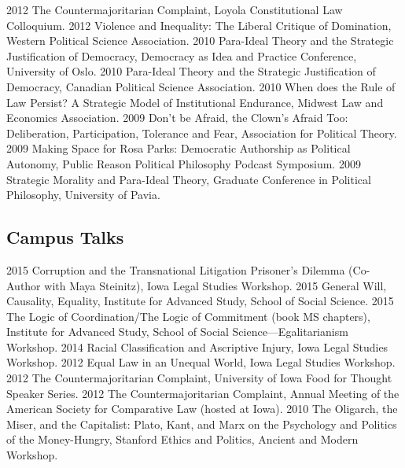 \documentclass[letterpaper]{moderncv}
\begin{document}
\cvitem
{2012}
{The Countermajoritarian Complaint, Loyola Constitutional Law Colloquium.}
\vspace{1mm}
\cvitem
{2012}
{Violence and Inequality: The Liberal Critique of Domination, Western Political Science Association.}
\vspace{1mm}
\cvitem
{2010}
{Para-Ideal Theory and the Strategic Justification of Democracy, Democracy as Idea and Practice Conference, University of Oslo.}
\vspace{1mm}
\cvitem
{2010}
{Para-Ideal Theory and the Strategic Justification of Democracy, Canadian Political Science Association.}
\vspace{1mm}
\cvitem
{2010}
{When does the Rule of Law Persist? A Strategic Model of Institutional Endurance, Midwest Law and Economics Association.}
\vspace{1mm}
\cvitem
{2009}
{Don't be Afraid, the Clown's Afraid Too: Deliberation, Participation, Tolerance and Fear, Association for Political Theory.}
\vspace{1mm}
\cvitem
{2009}
{Making Space for Rosa Parks: Democratic Authorship as Political Autonomy, Public Reason Political Philosophy Podcast Symposium.}
\vspace{1mm}
\cvitem
{2009}
{Strategic Morality and Para-Ideal Theory, Graduate Conference in Political Philosophy, University of Pavia.}
\vspace{1mm}
\subsection{Campus Talks}
\cvitem
{2015}
{Corruption and the Transnational Litigation Prisoner's Dilemma (Co-Author with Maya Steinitz), Iowa Legal Studies Workshop.}
\vspace{1mm}
\cvitem
{2015}
{General Will, Causality, Equality, Institute for Advanced Study, School of Social Science.}
\vspace{1mm}
\cvitem
{2015}
{The Logic of Coordination/The Logic of Commitment (book MS chapters), Institute for Advanced Study, School of Social Science---Egalitarianism Workshop.}
\vspace{1mm}
\cvitem
{2014}
{Racial Classification and Ascriptive Injury, Iowa Legal Studies Workshop.}
\vspace{1mm}
\cvitem
{2012}
{Equal Law in an Unequal World, Iowa Legal Studies Workshop.}
\vspace{1mm}
\cvitem
{2012}
{The Countermajoritarian Complaint, University of Iowa Food for Thought Speaker Series.}
\vspace{1mm}
\cvitem
{2012}
{The Countermajoritarian Complaint, Annual Meeting of the American Society for Comparative Law (hosted at Iowa).}
\vspace{1mm}
\cvitem
{2010}
{The Oligarch, the Miser, and the Capitalist: Plato, Kant, and Marx on the Psychology and Politics of the Money-Hungry, Stanford Ethics and Politics, Ancient and Modern Workshop.}
\vspace{1mm}
\end{document}
